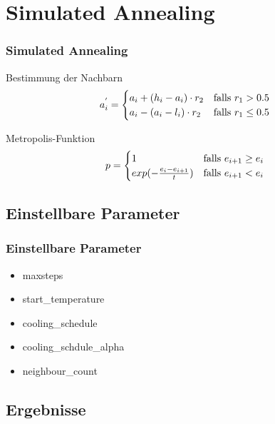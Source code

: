 \section{Simulated Annealing}

\begin{frame}
\frametitle{Simulated Annealing}
    \begin{block}{Bestimmung der Nachbarn}
       \begin{equation}
           a_{i}^{'} =
           \begin{cases}
               a_i + (h_i - a_i) \cdot r_2 & \text{falls } r_1 > 0.5 \\
               a_i - (a_i - l_i) \cdot r_2 & \text{falls } r_1 \le 0.5 \notag
           \end{cases}
       \end{equation}
   \end{block}
   \begin{block}{Metropolis-Funktion}
       \begin{equation}
              p =
              \begin{cases}
                  1 & \text{falls } e_{i+1} \ge e_i \\
                  exp(- \frac{e_i - e_{i+1}}{t}) & \text{falls } e_{i+1} < e_i \notag
              \end{cases}
          \end{equation}
      \end{block}
\end{frame}

\subsection{Einstellbare Parameter}

\begin{frame}
\frametitle{Einstellbare Parameter}
    \begin{itemize}
        \item maxsteps
        \item start\_temperature
        \item cooling\_schedule
        \item cooling\_schdule\_alpha
        \item neighbour\_count
    \end{itemize}
\end{frame}

\subsection{Ergebnisse}


